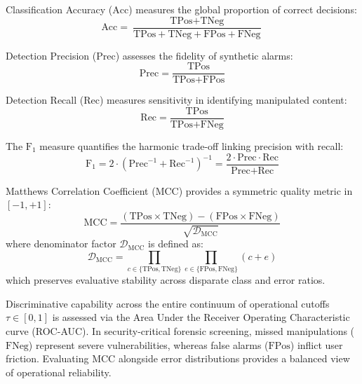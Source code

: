 \documentclass[conference]{IEEEtran}
\begin{document}
Classification Accuracy ($\text{Acc}$) measures the global proportion of correct decisions:
\begin{equation}
\text{Acc} = \frac{\text{TPos} + \text{TNeg}}{\text{TPos} + \text{TNeg} + \text{FPos} + \text{FNeg}}
\end{equation}

Detection Precision ($\text{Prec}$) assesses the fidelity of synthetic alarms:
\begin{equation}
\text{Prec} = \frac{\text{TPos}}{\text{TPos} + \text{FPos}}
\end{equation}

Detection Recall ($\text{Rec}$) measures sensitivity in identifying manipulated content:
\begin{equation}
\text{Rec} = \frac{\text{TPos}}{\text{TPos} + \text{FNeg}}
\end{equation}

The $\text{F}_1$ measure quantifies the harmonic trade-off linking precision with recall:
\begin{equation}
\text{F}_1 = 2 \cdot \left( \text{Prec}^{-1} + \text{Rec}^{-1} \right)^{-1} = \frac{2 \cdot \text{Prec} \cdot \text{Rec}}{\text{Prec} + \text{Rec}}
\end{equation}

Matthews Correlation Coefficient ($\text{MCC}$) provides a symmetric quality metric in $[-1, +1]$:
\begin{equation}
\text{MCC} = \frac{(\text{TPos} \times \text{TNeg}) - (\text{FPos} \times \text{FNeg})}{\sqrt{\mathcal{D}_{\text{MCC}}}}
\end{equation}
where denominator factor $\mathcal{D}_{\text{MCC}}$ is defined as:
\begin{equation}
\mathcal{D}_{\text{MCC}} = \prod_{c \in \{\text{TPos}, \text{TNeg}\}} \prod_{e \in \{\text{FPos}, \text{FNeg}\}} (c + e)
\end{equation}
which preserves evaluative stability across disparate class and error ratios.

Discriminative capability across the entire continuum of operational cutoffs $\tau \in [0, 1]$ is assessed via the Area Under the Receiver Operating Characteristic curve (ROC-AUC). In security-critical forensic screening, missed manipulations ($\text{FNeg}$) represent severe vulnerabilities, whereas false alarms ($\text{FPos}$) inflict user friction. Evaluating $\text{MCC}$ alongside error distributions provides a balanced view of operational reliability.
\end{document}

